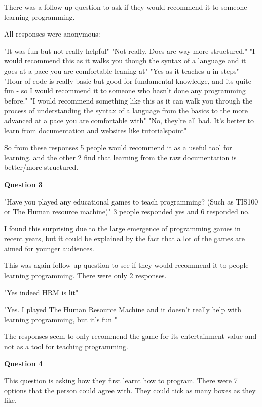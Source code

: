\documentclass[12pt]{article}
\begin{document}
There was a follow up question to ask if they would recommend it to someone learning programming.

All responses were anonymous:

"It was fun but not really helpful"\newline
"Not really. Docs are way more structured."\newline
"I would recommend this as it walks you though the syntax of a language and it goes at a pace you are comfortable leaning at"\newline
"Yes as it teaches u in steps"\newline
"Hour of code is really basic but good for fundamental knowledge, and its quite fun - so I would recommend it to someone who hasn't done any programming before."\newline
"I would recommend something like this as it can walk you through the process of understanding the syntax of a language from the basics to the more advanced at a pace you are comfortable with"\newline
"No, they're all bad. It's better to learn from documentation and websites like tutorialspoint"

So from these responses 5 people would recommend it as a useful tool for learning. and the other 2 find that learning from the raw documentation is better/more structured.


\textbf{Question 3}

"Have you played any educational games to teach programming? (Such as TIS100 or The Human resource machine)"
3 people responded yes and 6 responded no.

I found this surprising due to the large emergence of programming games in recent years, but it could be explained by the fact that a lot of the games are aimed for younger audiences.

This was again follow up question to see if they would recommend it to people learning programming. There were only 2 responses.

"Yes indeed HRM is lit" 

"Yes. I played The Human Resource Machine and it doesn't really help with learning programming, but it's fun "

The responses seem to only recommend the game for its entertainment value and not as a tool for teaching programming.


\textbf{Question 4}

This question is asking how they first learnt how to program. There were 7 options that the person could agree with. They could tick as many boxes as they like.
\end{document}

